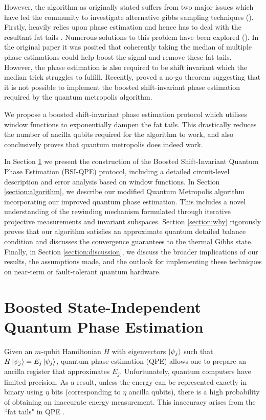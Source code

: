 \documentclass[aps,floatfix,10pt,amssymb,amsfont,amsmath,superscriptaddress,float,nofootinbib,longbibliography,nobalancelastpage,twocolumn]{revtex4-2}
\begin{document}
However, the algorithm as originally stated suffers from two major issues which have led the community to investigate alternative gibbs sampling techniques (\cite{}). Firstly, \cite{Temme_2011} heavily relies upon phase estimation and hence has to deal with the resultant fat tails \cite{}.  Numerous solutions to this problem have been explored (\cite{}). In the original paper \cite{Temme_2011} it was posited that coherently taking the median of multiple phase estimations could help boost the signal and remove these fat tails. However, the phase estimation is also required to be shift invariant which the median trick struggles to fulfill. Recently, \cite{chen2023quantumthermalstatepreparation} proved a no-go theorem suggesting that it is not possible to implement the boosted shift-invariant phase estimation required by the quantum metropolis algorithm. 

We propose a boosted shift-invariant phase estimation protocol which utilises window functions to exponentially dampen the fat tails. This drastically reduces the number of ancilla qubits required for the algorithm to work, and also conclusively proves that quantum metropolis does indeed work. 

In Section \ref{section:boostedphaseestimation} we present the construction of the Boosted Shift-Invariant Quantum Phase Estimation (BSI-QPE) protocol, including a detailed circuit-level description and error analysis based on window functions. In Section \ref{section:algorithm}, we describe our modified Quantum Metropolis algorithm incorporating our improved quantum phase estimation. This includes a novel understanding of the rewinding mechanism formulated through iterative projective measurements and invariant subspaces. Section \ref{section:why} rigorously proves that our algorithm satisfies an approximate quantum detailed balance condition and discusses the convergence guarantees to the thermal Gibbs state. Finally, in Section \ref{section:discussion}, we discuss the broader implications of our results, the assumptions made, and the outlook for implementing these techniques on near-term or fault-tolerant quantum hardware.


\section{Boosted State-Independent Quantum Phase Estimation}
\label{section:boostedphaseestimation}
Given an $m$-qubit Hamiltonian $H$ with eigenvectors $\ket{\psi_j}$ such that $H\ket{\psi_j} = E_j \ket{\psi_j}$, quantum phase estimation (QPE) allows one to prepare an ancilla register that approximates $E_j$. Unfortunately, quantum computers have limited precision. As a result, unless the energy can be represented exactly in binary using $\eta$ bits (corresponding to $\eta$ ancilla qubits), there is a high probability of obtaining an inaccurate energy measurement. This inaccuracy arises from the ``fat tails" in QPE \cite{Nielsen_Chuang_2010}.
\end{document}
